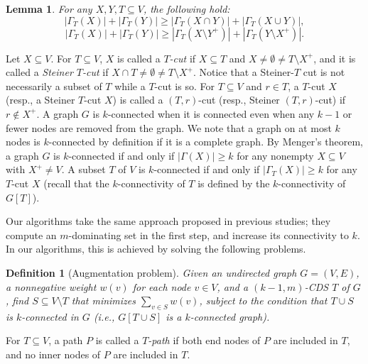\documentclass[11pt]{article}
\newtheorem{lemma}{Lemma}
\newtheorem{definition}{Definition}
\begin{document}
\begin{lemma}\label{lem.submodularity}
 For any $X,Y,T \subseteq V$,
  the following hold:
 \begin{equation}\label{eq.submodular}
 |\Gamma_T(X)| + |\Gamma_T(Y)| \geq
  |\Gamma_T(X \cap Y)| + |\Gamma_T(X \cup Y)|,
 \end{equation}
 \begin{equation}\label{eq.negamodular}
 |\Gamma_T(X)| + |\Gamma_T(Y)| \geq
  |\Gamma_T(X \setminus Y^+)| + |\Gamma_T(Y \setminus X^+)|.
 \end{equation}
\end{lemma}

 
Let $X \subseteq V$.
For $T\subseteq V$,
$X$ is called a
 \emph{$T$-cut} if $X \subseteq T$ and  $X \neq \emptyset \neq T
 \setminus X^+$, and it is called a
\emph{Steiner $T$-cut} if
$X \cap T \neq \emptyset \neq T\setminus X^+$.
 Notice that a Steiner-$T$ cut is not necessarily a subset of $T$
 while a $T$-cut is so.
For $T \subseteq V$ and $r \in T$,
 a $T$-cut $X$
 (resp., a Steiner $T$-cut $X$)
 is called a $(T,r)$-cut
 (resp., Steiner $(T,r)$-cut)
 if $r\not\in X^+$.
A graph $G$ is $k$-connected
when it is connected even when any $k-1$ or fewer nodes are removed from the graph.
We note that a graph on at most $k$ nodes is $k$-connected by definition if it is a complete graph.
By Menger's theorem, a graph $G$ is $k$-connected if and only if $|\Gamma(X)|
\geq k$ for any nonempty $X \subseteq V$ with $X^+ \neq V$.
A subset $T$ of $V$ is $k$-connected if and only if $|\Gamma_T(X)|\geq k $
for any $T$-cut $X$
(recall that the $k$-connectivity of $T$ is defined by the
$k$-connectivity of $G[T]$).

Our algorithms take the same approach
proposed in
previous studies;
they compute an $m$-dominating set in the first step, and
increase its connectivity to $k$.
In our algorithms, this is achieved by solving
the following problems.

 \begin{definition}[Augmentation problem]
  \label{def.augmentation}
 Given an undirected graph $G=(V,E)$, a nonnegative weight $w(v)$ for
 each node $v \in V$, and a $(k-1,m)$-CDS
 $T$ of $G$, find $S \subseteq V \setminus T$
 that minimizes $\sum_{v \in S}w(v)$, 
 subject to the condition that $T \cup S$ is $k$-connected in $G$ (i.e.,
  $G[T\cup S]$ is a $k$-connected graph).
 \end{definition}

 For $T \subseteq V$, a path $P$ is called a \emph{$T$-path}
 if both end nodes of $P$ are included in $T$, and no inner nodes of $P$
 are included in $T$. 
\end{document}
